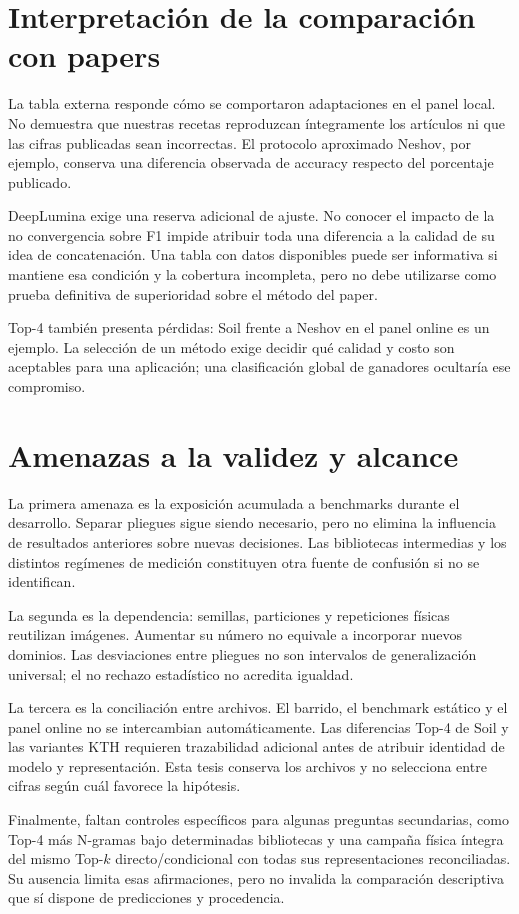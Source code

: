 \section{Interpretación de la comparación con papers}
La tabla externa responde cómo se comportaron adaptaciones en el panel local. No demuestra que nuestras recetas reproduzcan íntegramente los artículos ni que las cifras publicadas sean incorrectas. El protocolo aproximado Neshov, por ejemplo, conserva una diferencia observada de accuracy respecto del porcentaje publicado.

DeepLumina exige una reserva adicional de ajuste. No conocer el impacto de la no convergencia sobre F1 impide atribuir toda una diferencia a la calidad de su idea de concatenación. Una tabla con datos disponibles puede ser informativa si mantiene esa condición y la cobertura incompleta, pero no debe utilizarse como prueba definitiva de superioridad sobre el método del paper.

Top-4 también presenta pérdidas: Soil frente a Neshov en el panel online es un ejemplo. La selección de un método exige decidir qué calidad y costo son aceptables para una aplicación; una clasificación global de ganadores ocultaría ese compromiso.

\section{Amenazas a la validez y alcance}
La primera amenaza es la exposición acumulada a benchmarks durante el desarrollo. Separar pliegues sigue siendo necesario, pero no elimina la influencia de resultados anteriores sobre nuevas decisiones. Las bibliotecas intermedias y los distintos regímenes de medición constituyen otra fuente de confusión si no se identifican.

La segunda es la dependencia: semillas, particiones y repeticiones físicas reutilizan imágenes. Aumentar su número no equivale a incorporar nuevos dominios. Las desviaciones entre pliegues no son intervalos de generalización universal; el no rechazo estadístico no acredita igualdad.

La tercera es la conciliación entre archivos. El barrido, el benchmark estático y el panel online no se intercambian automáticamente. Las diferencias Top-4 de Soil y las variantes KTH requieren trazabilidad adicional antes de atribuir identidad de modelo y representación. Esta tesis conserva los archivos y no selecciona entre cifras según cuál favorece la hipótesis.

Finalmente, faltan controles específicos para algunas preguntas secundarias, como Top-4 más N-gramas bajo determinadas bibliotecas y una campaña física íntegra del mismo Top-\(k\) directo/condicional con todas sus representaciones reconciliadas. Su ausencia limita esas afirmaciones, pero no invalida la comparación descriptiva que sí dispone de predicciones y procedencia.

